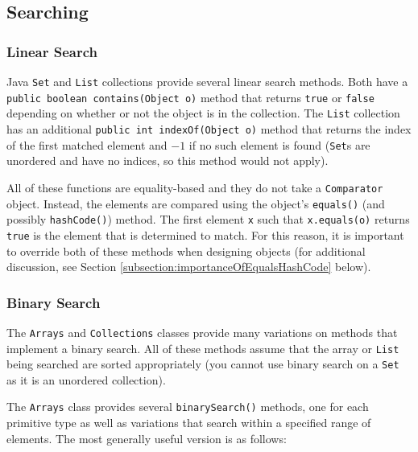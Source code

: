 \subsection{Searching}

\subsubsection{Linear Search}

Java \texttt{Set} and \texttt{List} collections provide
several linear search methods.  Both have a 
\texttt{public boolean contains(Object o)} method that returns
\texttt{true} or \texttt{false} depending on whether or
not the object is in the collection.  The \texttt{List} collection
has an additional \texttt{public int indexOf(Object o)} method
that returns the index of the first matched element and $-1$ if no such 
element is found (\texttt{Set}s
are unordered and have no indices, so this method would not apply).  

All of these functions are equality-based and they do not take a 
\texttt{Comparator} object.  Instead, the elements are compared
using the object's \texttt{equals()} (and possibly 
\texttt{hashCode()}) method.  The first element \texttt{x}
such that  \texttt{x.equals(o)} returns \texttt{true} 
is the element that is determined to match.  For this reason, it is important
to override both of these methods when designing objects (for additional
discussion, see Section \ref{subsection:importanceOfEqualsHashCode} below).

\subsubsection{Binary Search}

The \texttt{Arrays} and \texttt{Collections} classes
provide many variations on methods that implement a binary search.  All
of these methods assume that the array or \texttt{List} being
searched are sorted appropriately (you cannot use binary search on a 
\texttt{Set} as it is an unordered collection).

The \texttt{Arrays} class provides several 
\texttt{binarySearch()} methods, one for each primitive type 
as well as variations that search within a specified range of elements.
The most generally useful version is as follows:

